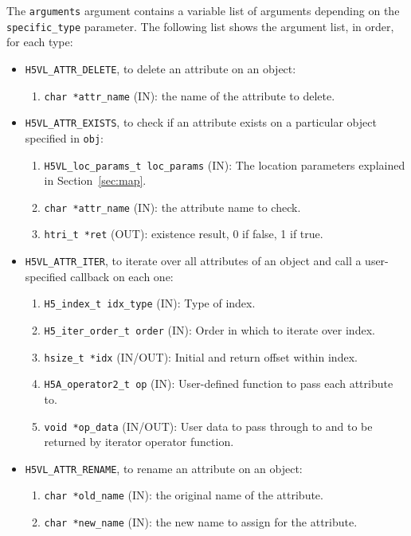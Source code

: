 The \texttt{arguments} argument contains a variable list of arguments
depending on the \texttt{specific\_type} parameter. The following list shows
the argument list, in order, for each type:

\begin{itemize}
\item \texttt{H5VL\_ATTR\_DELETE}, to delete an attribute on an object:
  \begin{enumerate}
  \item \texttt{char *attr\_name} (IN): the name of the attribute to delete.
  \end{enumerate}

\item \texttt{H5VL\_ATTR\_EXISTS}, to check if an attribute exists on a
  particular object specified in \texttt{obj}:
  \begin{enumerate}
  \item \texttt{H5VL\_loc\_params\_t loc\_params} (IN): The location parameters
    explained in Section~\ref{sec:map}.
  \item \texttt{char *attr\_name} (IN): the attribute name to check.
  \item \texttt{htri\_t *ret} (OUT): existence result, 0 if false, 1 if true.
  \end{enumerate}

\item \texttt{H5VL\_ATTR\_ITER}, to iterate over all attributes of an object and call a user-specified callback on each one:
  \begin{enumerate}
  \item \texttt{H5\_index\_t idx\_type} (IN): Type of index.\\
  \item \texttt{H5\_iter\_order\_t order} (IN): Order in which to iterate over index.\\
  \item \texttt{hsize\_t *idx} (IN/OUT): Initial and return offset within index.\\
  \item \texttt{H5A\_operator2\_t op} (IN): User-defined function to pass each attribute to. \\
  \item \texttt{void *op\_data} (IN/OUT): User data to pass through to and to be returned by iterator operator function. \\
  \end{enumerate}

\item \texttt{H5VL\_ATTR\_RENAME}, to rename an attribute on an object:
  \begin{enumerate}
  \item \texttt{char *old\_name} (IN): the original name of the attribute.
  \item \texttt{char *new\_name} (IN): the new name to assign for the attribute.
  \end{enumerate}

\end{itemize}

